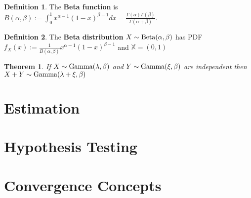 \documentclass[12pt]{article}
\newtheorem{thm}{Theorem}[section]
\theoremstyle{definition}
\newtheorem*{defn*}{Definition}
\newcommand{\X}{\mathbb{X}}
\begin{document}
\begin{defn*}
  The \textbf{Beta function} is $B(\alpha, \beta) := \int_0^1x^{\alpha - 1}(1 - x)^{\beta - 1}dx = \frac{\Gamma(\alpha)\Gamma(\beta)}{\Gamma(\alpha + \beta)}$.
\end{defn*}

\begin{defn*}
  The \textbf{Beta distribution} $X \sim \textnormal{Beta}(\alpha, \beta)$ has PDF $f_X(x) := \frac{1}{B(\alpha, \beta)}x^{\alpha - 1}(1 - x)^{\beta - 1}$ and $\X = (0, 1)$
\end{defn*}


\begin{thm}
  If $X \sim \textnormal{Gamma}(\lambda, \beta)$ and $Y \sim \textnormal{Gamma}(\xi, \beta)$ are independent then $X + Y \sim \textnormal{Gamma}(\lambda + \xi, \beta)$
\end{thm}

\section{Estimation}

\section{Hypothesis Testing}

\section{Convergence Concepts}
\end{document}
